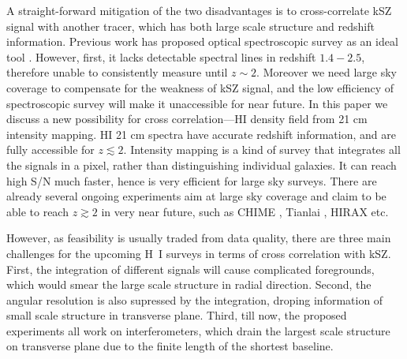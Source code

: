 A straight-forward mitigation of the two disadvantages is to cross-correlate 
kSZ signal with another tracer, which has both large scale structure and redshift information. 
Previous work has proposed optical spectroscopic survey as an ideal tool \cite{Hand12,Shao11,Li14}. 
However, first, it lacks detectable spectral lines in redshift $1.4-2.5$, 
therefore unable to consistently measure until $z\sim2$. 
Moreover we need large sky coverage to compensate for the weakness of kSZ signal, and the low efficiency of spectroscopic survey will make it unaccessible for near future.  
In this paper we discuss a new possibility for cross correlation---HI density field from 21 cm intensity mapping. 
HI 21 cm spectra have accurate redshift information, 
and are fully accessible for $z\lesssim2$.  
Intensity mapping is a kind of survey that 
integrates all the signals in a pixel,  
rather than distinguishing individual galaxies.  
It can reach high S/N much faster, hence is very efficient for large sky surveys. 
There are already several ongoing experiments aim at large sky coverage and claim to be able to reach $z\gtrsim2$ in very near future, such as
CHIME \cite{2014SPIE.9145E..22B}, Tianlai \cite{2015ApJ...798...40X}, 
HIRAX \cite{HIRAX} etc.

However, as feasibility is usually traded from data quality, 
there are three main challenges for the upcoming H~I surveys  
in terms of cross correlation with kSZ. 
First, the integration of different signals will cause complicated foregrounds, 
which would smear the large scale structure in radial direction\cite{DiMatteo04,Masui13}. 
Second, the angular resolution is also supressed by the integration, 
droping information of small scale structure in transverse plane. 
Third, till now, the proposed experiments all work on interferometers, 
which drain the largest scale structure on transverse plane  
due to the finite length of the shortest baseline. 

